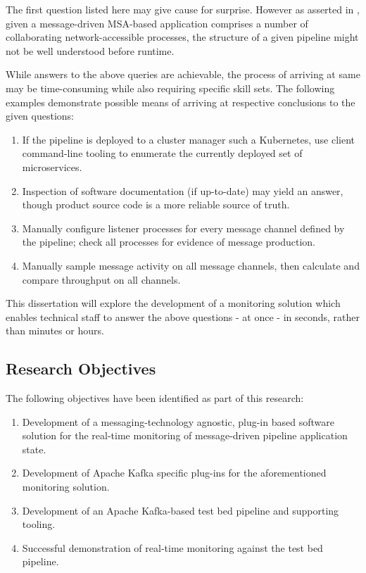 The first question listed here may give cause for surprise. However as asserted in \cite{woods2016}, given a message-driven MSA-based application comprises a number of collaborating network-accessible processes, the structure of a given pipeline might not be well understood before runtime. 

While answers to the above queries are achievable, the process of arriving at same may be time-consuming while also requiring specific skill sets. The following examples demonstrate possible means of arriving at respective conclusions to the given questions:

\begin{enumerate}
	\item If the pipeline is deployed to a cluster manager such a Kubernetes, use client command-line tooling to enumerate the currently deployed set of microservices.
	\item Inspection of software documentation (if up-to-date) may yield an answer, though product source code is a more reliable source of truth.
	\item Manually configure listener processes for every message channel defined by the pipeline; check all processes for evidence of message production.
	\item Manually sample message activity on all message channels, then calculate and compare throughput on all channels.
\end{enumerate}

This dissertation will explore the development of a monitoring solution which enables technical staff to answer the above questions - at once - in seconds, rather than minutes or hours.	

\subsection{Research Objectives} \label{intro_objectives}

The following objectives have been identified as part of this research:

\begin{enumerate}
	\item Development of a messaging-technology agnostic, plug-in based software solution for the real-time monitoring of message-driven pipeline application state.
	\item Development of Apache Kafka specific plug-ins for the aforementioned monitoring solution.
	\item Development of an Apache Kafka-based test bed pipeline and supporting tooling. 
	\item Successful demonstration of real-time monitoring against the test bed pipeline.
	
\end{enumerate}

